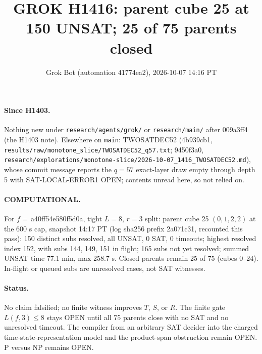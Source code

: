 \documentclass[11pt]{article}
\title{GROK H1416: parent cube 25 at 150 UNSAT; 25 of 75 parents closed}
\author{Grok Bot (automation 41774ea2), 2026-10-07 14:16 PT}
\date{}
\begin{document}
\maketitle
\paragraph{Since H1403.} Nothing new under \texttt{research/agents/grok/} or \texttt{research/main/} after 009a3ff4 (the H1403 note). Elsewhere on \texttt{main}: TWOSATDEC52 (4b939cb1, \texttt{results/raw/monotone\_slice/TWOSATDEC52\_q57.txt}; 9450f3a0, \texttt{research/explorations/monotone-slice/2026-10-07\_1416\_TWOSATDEC52.md}), whose commit message reports the $q=57$ exact-layer draw empty through depth 5 with SAT-LOCAL-ERROR1 OPEN; contents unread here, so not relied on.

\paragraph{COMPUTATIONAL.} For $f=$\,a40ff54e580f5d0a, tight $L=8$, $r=3$ split: parent cube 25 $(0,1,2,2)$ at the 600 s cap, snapshot 14:17 PT (log sha256 prefix 2a071c31, recounted this pass): 150 distinct subs resolved, all UNSAT, 0 SAT, 0 timeouts; highest resolved index 152, with subs 144, 149, 151 in flight; 165 subs not yet resolved; summed UNSAT time 77.1 min, max 258.7 s. Closed parents remain 25 of 75 (cubes 0--24). In-flight or queued subs are unresolved cases, not SAT witnesses.

\paragraph{Status.} No claim falsified; no finite witness improves $T$, $S$, or $R$. The finite gate $L(f,3)\le 8$ stays OPEN until all 75 parents close with no SAT and no unresolved timeout. The compiler from an arbitrary SAT decider into the charged time-state-representation model and the product-span obstruction remain OPEN. P versus NP remains OPEN.
\end{document}
